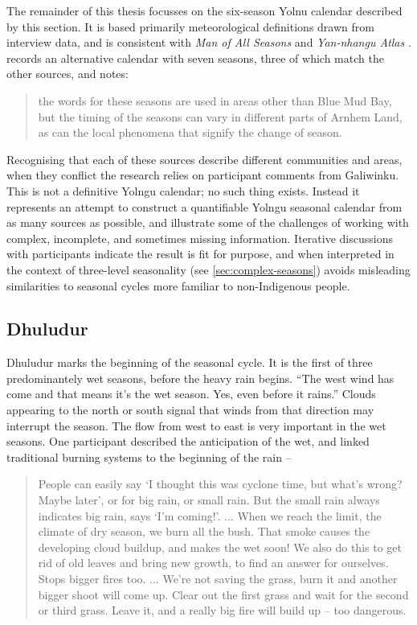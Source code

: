 The remainder of this thesis focusses on the six-season Yolnu calendar
described by this section.  It is based primarily meteorological definitions
drawn from interview data, and is consistent with \textit{Man of All Seasons}
\citep{davis1989} and \textit{Yan-nhangu Atlas} \citep[][p36]{atlas2014}.
\citet[][p.107, App 1 p.18]{barber2005} records an alternative calendar with
seven seasons, three of which match the other sources, and notes:
\begin{quote}
    the words for these seasons are used in areas other than Blue Mud Bay, but
    the timing of the seasons can vary in different parts of Arnhem Land, as can
    the local phenomena that signify the change of season.
\end{quote}

Recognising that each of these sources describe different communities
and areas, when they conflict the research relies on participant comments
from Galiwinku.  This is not a definitive Yolngu calendar; no such thing
exists.  Instead it represents an attempt to construct a quantifiable Yolngu
seasonal calendar from as many sources as possible, and illustrate some of
the challenges of working with complex, incomplete, and sometimes missing
information.  Iterative discussions with participants indicate the result is
fit for purpose, and when interpreted in the context of three-level seasonality
(see \cref{sec:complex-seasons}) avoids misleading similarities to seasonal
cycles more familiar to non-Indigenous people.


\subsection{Dhuludur}
Dhuludur marks the beginning of the seasonal cycle.  It is the
first of three predominantely wet seasons, before the heavy rain begins.
%
``The west wind has come and that means it's the wet season.  Yes, even
before it rains.''  Clouds appearing to the north or south signal that
winds from that direction may interrupt the season.   The flow from west
to east is very important in the wet seasons.
%
One participant described the anticipation of the wet, and linked traditional
burning systems to the beginning of the rain --
\begin{quote}
    People can easily say `I thought this was cyclone time, but what's wrong?
    Maybe later', or for big rain, or small rain.  But the small rain always
    indicates big rain, says `I'm coming!'.
    ...
    When we reach the limit, the climate of dry season, we burn all the bush.
    That smoke causes the developing cloud buildup, and makes the wet soon!
    We also do this to get rid of old leaves and bring new growth,
    to find an answer for ourselves.  Stops bigger fires too.
    ...
    We're not saving the grass, burn it and another bigger shoot will come up.
    Clear out the first grass and wait for the second or third grass.
    Leave it, and a really big fire will build up -- too dangerous.
\end{quote}

